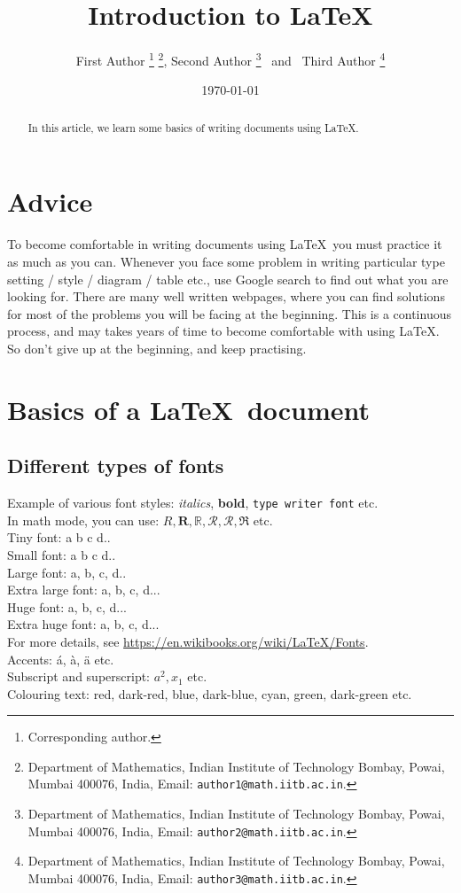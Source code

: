 \documentclass[11pt,a4paper,leqno]{article}
\title{Introduction to \LaTeX} %
\author{
First Author
\footnote{Corresponding author.}
\thanks{Department of Mathematics, 
	Indian Institute of Technology Bombay, 
	Powai, Mumbai 400076, India, 
	{Email:} \texttt{author1@math.iitb.ac.in}.}, 
Second Author
	\thanks{Department of Mathematics, 
	Indian Institute of Technology Bombay, 
	Powai, Mumbai 400076, India, 
	{Email:} \texttt{author2@math.iitb.ac.in}.} 
\ and \ 
Third Author
\thanks{Department of Mathematics, 
	Indian Institute of Technology Bombay, 
	Powai, Mumbai 400076, India, 
	{Email:} \texttt{author3@math.iitb.ac.in}.}
}
\date{\today}
\numberwithin{equation}{subsection}
\theoremstyle{definition}
\begin{document}
\maketitle

\pdfbookmark{\contentsname}{Contents} %
\tableofcontents %

\begin{abstract}
	In this article, we learn some basics of writing documents using \LaTeX. 
\end{abstract}


\section{Advice} 
To become comfortable in writing documents using \LaTeX\, you must practice it as much as you can. 
Whenever you face some problem in writing particular type setting / style / diagram / table etc., 
use Google search to find out what you are looking for. There are many well written webpages, 
where you can find solutions for most of the problems you will be facing at the beginning. 
This is a continuous process, and may takes years of time to become comfortable with using \LaTeX. 
So don't give up at the beginning, and keep practising. 


\section{Basics of a \LaTeX\ document}
\subsection{Different types of fonts}
Example of various font styles: 
{\it italics}, {\bf bold}, {\tt type writer font} etc. \\ 
In math mode, you can use: $R, \mathbf{R}, \mathbb{R}, \mathcal{R}, \mathscr{R}, \mathfrak{R}$ etc. \\ 
Tiny font: {\tiny a b c d..} \\ 
Small font: {\small a b c d..} \ font: {\large a, b, c, d..} \\ 
Extra large font: {\Large a, b, c, d...} \ font: {\huge a, b, c, d...} \\ 
Extra huge font: {\Huge a, b, c, d...} \\ 
For more details, see \href{https://en.wikibooks.org/wiki/LaTeX/Fonts}{https://en.wikibooks.org/wiki/LaTeX/Fonts}. \\ 
Accents: \'a, \`a, \"a etc. \\ 
Subscript and superscript: $a^2, x_1$ etc. \\ 
Colouring text: {\color{red} red}, {\color{mdtRed} dark-red}, {\color{blue} blue}, {\color{dblue} dark-blue}, 
{\color{cyan} cyan}, {\color{green} green}, {\color{dgreen} dark-green} etc. \\ 
\end{document}
